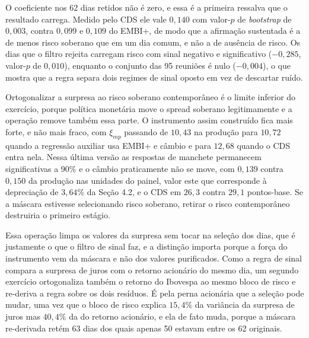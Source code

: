 \documentclass[preprint,authoryear,review,12pt]{elsarticle}
\begin{document}
O coeficiente nos 62 dias retidos não é zero, e essa é a primeira ressalva que o resultado carrega. Medido pelo CDS ele vale $0{,}140$ com valor-$p$ de \textit{bootstrap} de $0{,}003$, contra $0{,}099$ e $0{,}109$ do EMBI+, de modo que a afirmação sustentada é a de menos risco soberano que em um dia comum, e não a de ausência de risco. Os dias que o filtro rejeita carregam risco com sinal negativo e significativo ($-0{,}285$, valor-$p$ de $0{,}010$), enquanto o conjunto das 95 reuniões é nulo ($-0{,}004$), o que mostra que a regra separa dois regimes de sinal oposto em vez de descartar ruído.

Ortogonalizar a surpresa ao risco soberano contemporâneo é o limite inferior do exercício, porque política monetária move o spread soberano legitimamente e a operação remove também essa parte. O instrumento assim construído fica mais forte, e não mais fraco, com $\xi_{mp}$ passando de $10{,}43$ na produção para $10{,}72$ quando a regressão auxiliar usa EMBI+ e câmbio e para $12{,}68$ quando o CDS entra nela. Nessa última versão as respostas de manchete permanecem significativas a 90\% e o câmbio praticamente não se move, com $0{,}139$ contra $0{,}150$ da produção nas unidades do painel, valor este que corresponde à depreciação de $3{,}64\%$ da Seção 4.2, e o CDS em $26{,}3$ contra $29{,}1$ pontos-base. Se a máscara estivesse selecionando risco soberano, retirar o risco contemporâneo destruiria o primeiro estágio.

Essa operação limpa os valores da surpresa sem tocar na seleção dos dias, que é justamente o que o filtro de sinal faz, e a distinção importa porque a força do instrumento vem da máscara e não dos valores purificados. Como a regra de sinal compara a surpresa de juros com o retorno acionário do mesmo dia, um segundo exercício ortogonaliza também o retorno do Ibovespa ao mesmo bloco de risco e re-deriva a regra sobre os dois resíduos. É pela perna acionária que a seleção pode mudar, uma vez que o bloco de risco explica $15{,}4\%$ da variância da surpresa de juros mas $40{,}4\%$ da do retorno acionário, e ela de fato muda, porque a máscara re-derivada retém 63 dias dos quais apenas 50 estavam entre os 62 originais.
\end{document}
